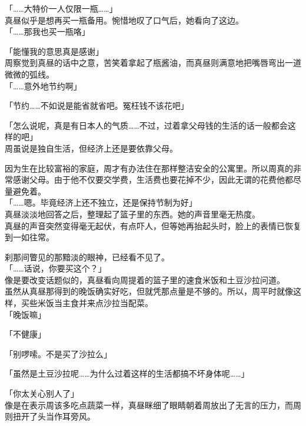 「……大特价一人仅限一瓶……」\\

真昼似乎是想再买一瓶备用。惋惜地叹了口气后，她看向了这边。\\

「……那我也买一瓶咯」

「能懂我的意思真是感谢」\\

周察觉到真昼的话中之意，苦笑着拿起了瓶酱油，而真昼则满意地把嘴唇弯出一道微微的弧线。\\

「……意外地节约啊」

「节约……不如说是能省就省吧。冤枉钱不该花吧」

「怎么说呢，真是有日本人的气质……不过，过着拿父母钱的生活的话一般都会这样的吧」\\

周虽说是独自生活，但经济上还是要依靠父母。

因为生在比较富裕的家庭，周才有办法住在那样整洁安全的公寓里。所以周真的非常感谢父母。由于他不仅要交学费，生活费也要花掉不少，因此无谓的花费他都尽量避免着。\\

「……嗯。毕竟经济上还不独立，还是保持节制为好」\\

真昼淡淡地回答之后，整理起了篮子里的东西。她的声音里毫无热度。\\

真昼的声音突然变得毫无起伏，有点吓人，但等她再抬起头时，脸上的表情已恢复到一如往常。

刹那间瞥见的那黯淡的眼神，已经看不见了。\\

「……话说，你要买这个？」\\

像是要改变话题似的，真昼看向周提着的篮子里的速食米饭和土豆沙拉问道。\\

虽然从真昼那得到的晚饭确实好吃，但就凭那点量是不够的。所以，周平时就像这样，买些米饭当主食并来点沙拉当配菜。\\

「晚饭嘛」

「不健康」

「别啰嗦。不是买了沙拉么」

「虽然是土豆沙拉呢……为什么过着这样的生活都搞不坏身体呢……」

「你太关心别人了」\\

像是在表示周该多吃点蔬菜一样，真昼眯细了眼睛朝着周放出了无言的压力，而周则扭开了头当作耳旁风。\\

